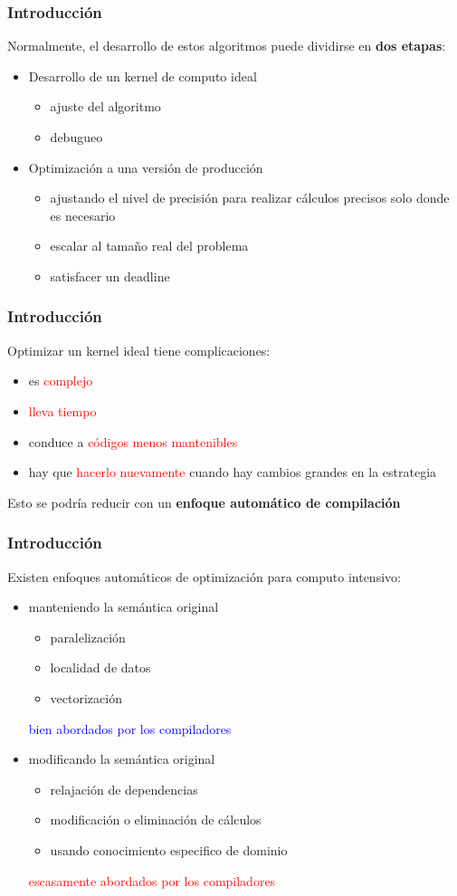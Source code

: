 \documentclass{beamer}\usetheme{Madrid} %
\begin{document}
\begin{frame}
\frametitle{Introducción}
Normalmente, el desarrollo de estos 
algoritmos puede dividirse en \textbf{dos etapas}:
\begin{itemize}
\item Desarrollo de un kernel de computo ideal
	\begin{itemize} 
	\item ajuste del algoritmo
	\item debugueo
	\end{itemize}
\item Optimización a una versión de producción
	\begin{itemize}
	\item ajustando el nivel de precisión para realizar cálculos
	precisos solo donde es necesario
	\item escalar al tamaño real del problema
	\item satisfacer un deadline
	\end{itemize}
\end{itemize}
\end{frame}
\begin{frame}
\frametitle{Introducción}
Optimizar un kernel ideal tiene complicaciones: 
\begin{itemize} 
\item es \textcolor{red}{complejo}
\item \textcolor{red}{lleva tiempo}
\item conduce a \textcolor{red}{códigos menos mantenibles}
\item hay que \textcolor{red}{hacerlo nuevamente} cuando hay cambios grandes en la estrategia
\end{itemize}
Esto se podría reducir con un \textbf{enfoque automático de compilación}
\end{frame}
\begin{frame}
\frametitle{Introducción}
	Existen enfoques automáticos de optimización para computo intensivo:
	\begin{itemize}
	\item manteniendo la semántica original
	\begin{itemize}
		\item paralelización
		\item localidad de datos
		\item vectorización
	\end{itemize}
	\textcolor{blue}{bien abordados por los compiladores}
	\item modificando la semántica original
	\begin{itemize}
		\item relajación de dependencias
		\item modificación o eliminación de cálculos
		\item usando conocimiento especifico de dominio 
	\end{itemize} 
	\textcolor{red}{escasamente abordados por los compiladores}
	\end{itemize}
\end{frame}
\end{document}
